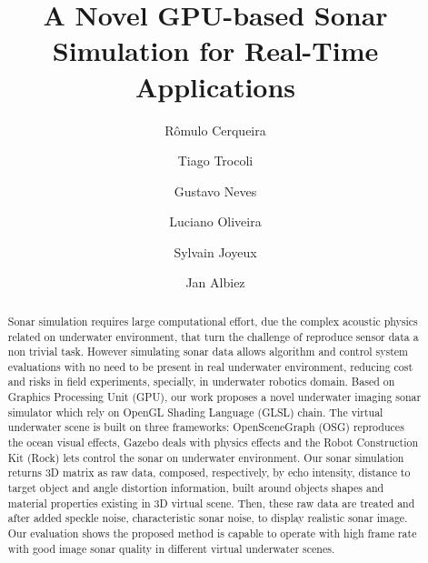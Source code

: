 \documentclass[final,5p,times]{elsarticle}
\begin{document}
\begin{frontmatter}



\title{A Novel GPU-based Sonar Simulation for Real-Time Applications}

\author[senai,ufba]{Rômulo Cerqueira} 
\author[senai]{Tiago Trocoli} 
\author[senai]{Gustavo Neves}
\author[ufba]{Luciano Oliveira}
\author[senai]{Sylvain Joyeux}
\author[senai,dfki]{Jan Albiez}

\address[senai]{Brazilian Institute of Robotics, SENAI CIMATEC, Salvador, Bahia, Brazil}
\address[ufba]{Intelligent Vision Research Lab, Federal University of Bahia, Salvador, Bahia, Brazil}
\address[dfki]{Robotics Innovation Center, DFKI GmbH, Bremen, Germany}

\begin{abstract}

Sonar simulation requires large computational effort, due the complex acoustic physics related on underwater environment, that turn the challenge of reproduce sensor data a non trivial task. However simulating sonar data allows algorithm and control system evaluations with no need to be present in real underwater environment, reducing cost and risks in field experiments, specially, in underwater robotics domain. Based on Graphics Processing Unit (GPU), our work proposes a novel underwater imaging sonar simulator which rely on OpenGL Shading Language (GLSL) chain. The virtual underwater scene is built on three frameworks: OpenSceneGraph (OSG) reproduces the ocean visual effects, Gazebo deals with physics effects and the Robot Construction Kit (Rock) lets control the sonar on underwater environment. Our sonar simulation returns 3D matrix as raw data, composed, respectively, by echo intensity, distance to target object and angle distortion information, built around objects shapes and material properties existing in 3D virtual scene. Then, these raw data are treated and after added speckle noise, characteristic sonar noise, to display realistic sonar image. Our evaluation shows the proposed method is capable to operate with high frame rate with good image sonar quality in different virtual underwater scenes.


\end{abstract}
\end{frontmatter}
\end{document}
